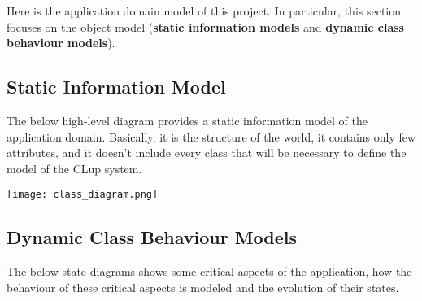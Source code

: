 Here is the application domain model of this project. In particular, this section focuses on the object model (\textbf{static information models} and \textbf{dynamic class behaviour models}).
\subsection{Static Information Model}
The below high-level diagram provides a static information model of the application domain. Basically, it is the structure of the world, it contains only few attributes, and it doesn't include every class that will be necessary to define the model of the CLup system. \newline

\texttt{[image: class\_diagram.png]}


\subsection{Dynamic Class Behaviour Models}
The below state diagrams shows some	critical aspects of	the	application, how the behaviour of these critical aspects is modeled and the evolution of their states.